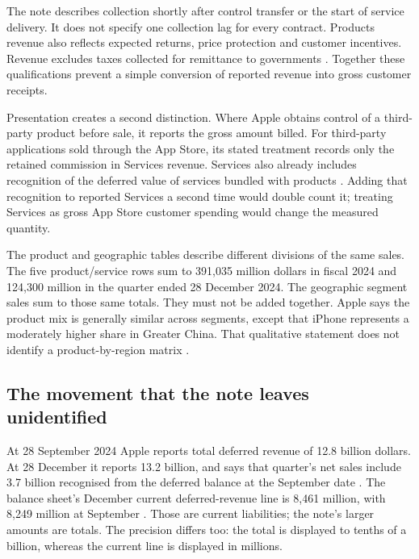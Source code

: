 The note describes collection shortly after control transfer or the start of
service delivery. It does not specify one collection lag for every contract.
Products revenue also reflects expected returns, price protection and customer
incentives. Revenue excludes taxes collected for remittance to governments
\citep[Notes 1--2, printed pp.~34--35]{apple2024}. Together these qualifications
prevent a simple conversion of reported revenue into gross customer receipts.

Presentation creates a second distinction. Where Apple obtains control of a
third-party product before sale, it reports the gross amount billed. For
third-party applications sold through the App Store, its stated treatment
records only the retained commission in Services revenue. Services also already
includes recognition of the deferred value of services bundled with products
\citep[Note 2, printed p.~35]{apple2024}. Adding that recognition to reported
Services a second time would double count it; treating Services as gross App
Store customer spending would change the measured quantity.

The product and geographic tables describe different divisions of the same
sales. The five product/service rows sum to 391,035 million dollars in fiscal
2024 and 124,300 million in the quarter ended 28 December 2024. The geographic
segment sales sum to those same totals. They must not be added together.
Apple says the product mix is generally similar across segments, except that
iPhone represents a moderately higher share in Greater China. That qualitative
statement does not identify a product-by-region matrix
\citep[Notes 2 and 13, printed pp.~35--36 and 46--47]{apple2024}
\citep[Notes 2 and 10, printed pp.~6 and 11]{apple2025q1}.

\subsection{The movement that the note leaves unidentified}

At 28 September 2024 Apple reports total deferred revenue of 12.8 billion
dollars. At 28 December it reports 13.2 billion, and says that quarter's net
sales include 3.7 billion recognised from the deferred balance at the September
date \citep[Note 2, printed p.~6]{apple2025q1}. The balance sheet's December
current deferred-revenue line is 8,461 million, with 8,249 million at September
\citep[printed p.~3]{apple2025q1}. Those are current liabilities; the note's
larger amounts are totals. The precision differs too: the total is displayed
to tenths of a billion, whereas the current line is displayed in millions.

